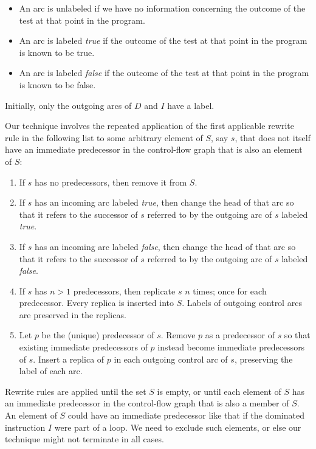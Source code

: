 \begin{itemize}
\item An arc is unlabeled if we have no information concerning the
  outcome of the test at that point in the program.
\item An arc is labeled \emph{true} if the outcome of the test at that
  point in the program is known to be true.
\item An arc is labeled \emph{false} if the outcome of the test at
  that point in the program is known to be false.
\end{itemize}

Initially, only the outgoing arcs of $D$ and $I$ have a label.

Our technique involves the repeated application of the first
applicable rewrite rule in the following list to some arbitrary
element of $S$, say $s$, that does not itself have an immediate
predecessor in the control-flow graph that is also an element of $S$:

\begin{enumerate}
\item If $s$ has no predecessors, then remove it from $S$.
\item If $s$ has an incoming arc labeled \emph{true}, then change the
  head of that arc so that it refers to the successor of $s$ referred
  to by the outgoing arc of $s$ labeled \emph{true}.
\item If $s$ has an incoming arc labeled \emph{false}, then change the
  head of that arc so that it refers to the successor of $s$ referred
  to by the outgoing arc of $s$ labeled \emph{false}.
\item If $s$ has $n>1$ predecessors, then replicate $s$ $n$ times;
  once for each predecessor.  Every replica is inserted into $S$.
  Labels of outgoing control arcs are preserved in the replicas.
\item Let $p$ be the (unique) predecessor of $s$.  Remove $p$ as a
  predecessor of $s$ so that existing immediate predecessors of $p$
  instead become immediate predecessors of $s$.  Insert a replica of
  $p$ in each outgoing control arc of $s$, preserving the label of
  each arc.
\end{enumerate}

\noindent
Rewrite rules are applied until the set $S$ is empty, or until each
element of $S$ has an immediate predecessor in the control-flow graph
that is also a member of $S$.  An element of $S$ could have an
immediate predecessor like that if the dominated instruction $I$ were
part of a loop.  We need to exclude such elements, or else our
technique might not terminate in all cases.

